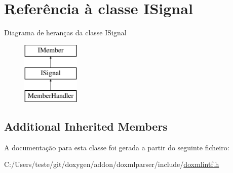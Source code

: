 \hypertarget{class_i_signal}{\section{Referência à classe I\-Signal}
\label{class_i_signal}
}
Diagrama de heranças da classe I\-Signal\begin{figure}[H]
\begin{center}
\leavevmode
\includegraphics[height=3.000000cm]{class_i_signal}
\end{center}
\end{figure}
\subsection*{Additional Inherited Members}


A documentação para esta classe foi gerada a partir do seguinte ficheiro\-:\begin{DoxyCompactItemize}
\item 
C\-:/\-Users/teste/git/doxygen/addon/doxmlparser/include/\hyperlink{include_2doxmlintf_8h}{doxmlintf.\-h}\end{DoxyCompactItemize}
